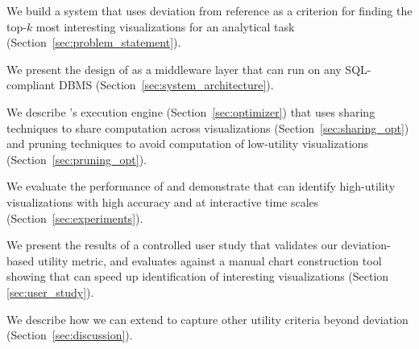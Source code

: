 \begin{denselist}
  \item We build a system that uses deviation from reference as a criterion for finding the
  top-$k$ most interesting visualizations for an analytical task (Section~\ref{sec:problem_statement}).

  \item We present the design of \SeeDB as a middleware layer that can run on any SQL-compliant DBMS 
  (Section~\ref{sec:system_architecture}).
  
  \item We describe \SeeDB's execution engine (Section~\ref{sec:optimizer}) that uses
  sharing techniques to share computation 
  across visualizations (Section~\ref{sec:sharing_opt}) and
  pruning techniques to avoid computation of low-utility visualizations
  (Section~\ref{sec:pruning_opt}).
  

  \item We evaluate the performance of \SeeDB and demonstrate that \SeeDB
  can identify high-utility visualizations with high accuracy and at interactive time scales
  (Section~\ref{sec:experiments}).

  \item We present the results of a controlled user study that validates our deviation-based 
  utility metric, and evaluates \SeeDB against a manual chart construction tool 
  showing that \SeeDB can speed up identification of interesting 
  visualizations (Section \ref{sec:user_study}).

  \item We describe how we can extend \SeeDB to capture other utility criteria
  beyond deviation (Section~\ref{sec:discussion}).
\end{denselist}

